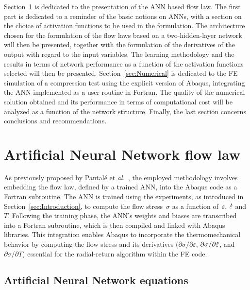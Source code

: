 \documentclass[algorithms,article,submit,pdftex,oneauthors]{Definitions/mdpi}
\makeatletter
\DeclareRobustCommand{\mdot}[1]{\accentset{\mbox{\bfseries .}}{#1}}
\DeclareRobustCommand{\eal}{et \emph{al.}\@\xspace}
\makeatother
\begin{document}
\textcolor{greencolor}{Section~\ref{sec:ANN} is dedicated to the presentation of the ANN based flow law.}
The first part is dedicated to a reminder of the basic notions on ANNs, with a section on the choice of activation functions to be used in the formulation.
\textcolor{greencolor}{The architecture chosen for the formulation of the flow laws based on a two-hidden-layer network will then be presented, together with the formulation of the derivatives of the output with regard to the input variables.}
The learning methodology and the results in terms of network performance as a function of the activation functions selected will then be presented.
\textcolor{greencolor}{Section~\ref{sec:Numerical} is dedicated to the FE simulation of a compression test using the explicit version of Abaqus, integrating the ANN implemented as a user routine in Fortran.}
The quality of the numerical solution obtained and its performance in terms of computational cost will be analyzed as a function of the network structure.
\textcolor{greencolor}{Finally, the last section concerns conclusions and recommendations.}

\section{Artificial Neural Network flow law}\label{sec:ANN}

\textcolor{greencolor}{As previously proposed by Pantalé \eal~\cite{Pantale-2021-EIN, Pantale-2023-DIA}, the employed methodology involves embedding the flow law, defined by a trained ANN, into the Abaqus code as a Fortran subroutine.
The ANN is trained using the experiments, as introduced in Section~\ref{sec:Introduction}, to compute the flow stress~$\sigma$ as a function of~$\varepsilon$, $\mdot{\varepsilon}$ and $T$.
Following the training phase, the ANN's weights and biases are transcribed into a Fortran subroutine, which is then compiled and linked with Abaqus libraries.
This integration enables Abaqus to incorporate the thermomechanical behavior by computing the flow stress and its derivatives ($\partial\sigma/\partial\varepsilon$, $\partial\sigma/\partial\mdot{\varepsilon}$, and $\partial\sigma/\partial T$) essential for the radial-return algorithm within the FE code.}

\textcolor{greencolor}{\subsection{Artificial Neural Network equations}\label{subsec:ANN-eqn}}
\end{document}
